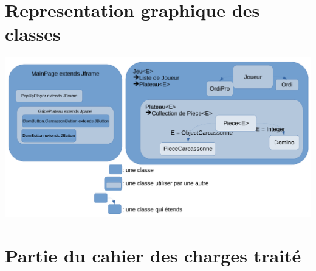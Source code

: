 \documentclass[11pt]{article}
\begin{document}
\section{Representation graphique des classes}
\label{sec:orgee4c2f8}
\begin{center}
\includegraphics[width=.9\linewidth]{./SchemaClasses.pdf}
\end{center}
\section{Partie du cahier des charges traité}
\label{sec:orgdc2e19e}
\end{document}
